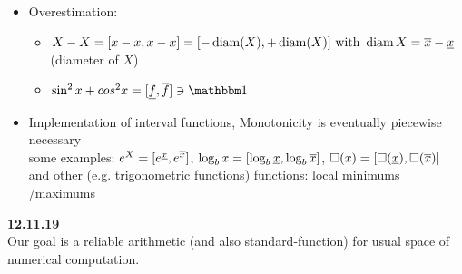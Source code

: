 \begin{itemize}
\begin{itemize}
		\item Overestimation:
		\begin{itemize}
			\item $X-X=[x-x,x-x]=[-\operatorname{diam}(X),+\operatorname{diam}(X)] \text{ with } \operatorname{diam} X=\overline{x}-\underline{x}$ (diameter of $X$)
			\item $\sin^2 x + cos^2 x=[\minval{f},\maxval{f}]\ni \one$
		\end{itemize} 
		\item Implementation of interval functions, Monotonicity is eventually piecewise necessary\\
		some examples: $e^X=[e^{\underline{x}},e^{\overline{x}}]$, $\log_b x=[\log_b \underline{x}, \log_b \overline{x}]$, $\square(x)=[\square(\underline{x}),\square(\overline{x})]$ and other (e.g. trigonometric functions) functions: local minimums /maximums
	\end{itemize}
\end{itemize}
\textbf{12.11.19}\\

Our goal is a reliable arithmetic (and also standard-function) for usual space of numerical computation.

